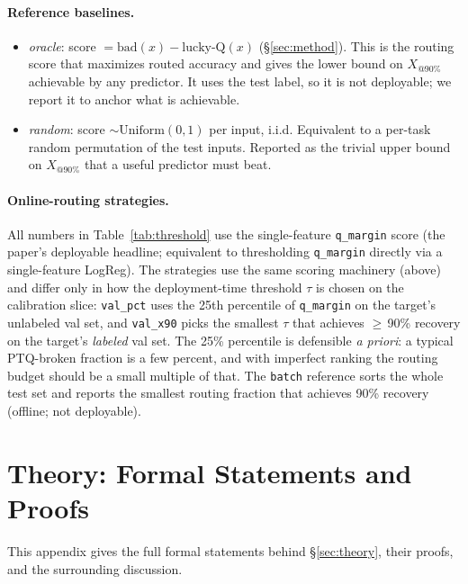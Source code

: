 \documentclass{article}
\makeatletter
\newcommand{\xat}[1]{\ensuremath{X_{@#1\%}}}
\makeatother
\begin{document}
\paragraph{Reference baselines.}
\begin{itemize}[leftmargin=*,topsep=2pt,itemsep=0pt]
\item \emph{oracle}: score $= \text{bad}(x) - \text{lucky-Q}(x)$ (\S\ref{sec:method}). This is the routing score that maximizes routed accuracy and gives the lower bound on \xat{90} achievable by any predictor. It uses the test label, so it is not deployable; we report it to anchor what is achievable.
\item \emph{random}: score $\sim \text{Uniform}(0,1)$ per input, i.i.d. Equivalent to a per-task random permutation of the test inputs. Reported as the trivial upper bound on \xat{90} that a useful predictor must beat.
\end{itemize}

\paragraph{Online-routing strategies.}
All numbers in Table~\ref{tab:threshold} use the single-feature \texttt{q\_margin} score (the paper's deployable headline; equivalent to thresholding \texttt{q\_margin} directly via a single-feature LogReg). The strategies use the same scoring machinery (above) and differ only in how the deployment-time threshold $\tau$ is chosen on the calibration slice: \texttt{val\_pct} uses the 25th percentile of \texttt{q\_margin} on the target's unlabeled val set, and \texttt{val\_x90} picks the smallest $\tau$ that achieves $\geq$\,90\% recovery on the target's \emph{labeled} val set. The 25\% percentile is defensible \emph{a priori}: a typical PTQ-broken fraction is a few percent, and with imperfect ranking the routing budget should be a small multiple of that. The \texttt{batch} reference sorts the whole test set and reports the smallest routing fraction that achieves 90\% recovery (offline; not deployable).

\section{Theory: Formal Statements and Proofs}\label{app:proofs}

This appendix gives the full formal statements behind \S\ref{sec:theory}, their proofs, and the surrounding discussion.
\end{document}
